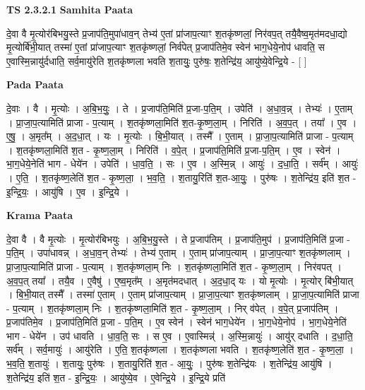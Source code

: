 \documentclass[17pt]{extarticle}
\begin{document}
\textbf{TS 2.3.2.1 } \newline
\textbf{Samhita Paata} \newline

दे॒वा वै मृ॒त्योर॑बिभयु॒स्ते प्र॒जाप॑ति॒मुपा॑धाव॒न् तेभ्य॑ ए॒तां प्रा॑जाप॒त्याꣳ श॒तकृ॑ष्णलां॒ निर॑वप॒त् तयै॒वैष्व॒मृत॑मदधा॒द्यो मृ॒त्योर्बि॑भी॒यात् तस्मा॑ ए॒तां प्रा॑जाप॒त्याꣳ श॒तकृ॑ष्णलां॒ निर्व॑पेत् प्र॒जाप॑तिमे॒व स्वेन॑ भाग॒धेये॒नोप॑ धावति॒ स ए॒वास्मि॒न्नायु॑र्दधाति॒ सर्व॒मायु॑रेति श॒तकृ॑ष्णला भवति श॒तायुः॒ पुरु॑षः॒ श॒तेन्द्रि॑य॒ आयु॑ष्ये॒वेन्द्रि॒ये - [  ] \newline

\textbf{Pada Paata} \newline

दे॒वाः । वै । मृ॒त्योः । अ॒बि॒भ॒युः॒ । ते । प्र॒जाप॑ति॒मिति॑ प्र॒जा-प॒ति॒म् । उपेति॑ । अ॒धा॒व॒न्न् । तेभ्यः॑ । ए॒ताम् । प्रा॒जा॒प॒त्यामिति॑ प्राजा - प॒त्याम् । श॒तकृ॑ष्णला॒मिति॑ श॒त-कृ॒ष्ण॒ला॒म् । निरिति॑ । अ॒व॒प॒त् । तया᳚ । ए॒व । ए॒षु॒ । अ॒मृत᳚म् । अ॒द॒धा॒त् । यः । मृ॒त्योः । बि॒भी॒यात् । तस्मै᳚ । ए॒ताम् । प्रा॒जा॒प॒त्यामिति॑ प्राजा - प॒त्याम् । श॒तकृ॑ष्णला॒मिति॑ श॒त - कृ॒ष्ण॒ला॒म् । निरिति॑ । व॒पे॒त् । प्र॒जाप॑ति॒मिति॑ प्र॒जा-प॒ति॒म् । ए॒व । स्वेन॑ । भा॒ग॒धेये॒नेति॑ भाग - धेये॑न । उपेति॑ । धा॒व॒ति॒ । सः । ए॒व । अ॒स्मि॒न्न् । आयुः॑ । द॒धा॒ति॒ । सर्व᳚म् । आयुः॑ । ए॒ति॒ । श॒तकृ॑ष्ण॒लेति॑ श॒त - कृ॒ष्ण॒ला॒ । भ॒व॒ति॒ । श॒तायु॒रिति॑ श॒त-आ॒युः॒ । पुरु॑षः । श॒तेन्द्रि॑य॒ इति॑ श॒त - इ॒न्द्रि॒यः॒ । आयु॑षि । ए॒व । इ॒न्द्रि॒ये ।  \newline


\textbf{Krama Paata} \newline

दे॒वा वै । वै मृ॒त्योः । मृ॒त्योर॑बिभयुः । अ॒बि॒भ॒यु॒स्ते । ते प्र॒जाप॑तिम् । प्र॒जाप॑ति॒मुप॑ । प्र॒जाप॑ति॒मिति॑ प्र॒जा - प॒ति॒म् । उपा॑धावन्न् । अ॒धा॒व॒न् तेभ्यः॑ । तेभ्य॑ ए॒ताम् । ए॒ताम् प्रा॑जाप॒त्याम् । प्रा॒जा॒प॒त्याꣳ श॒तकृ॑ष्णलाम् । प्रा॒जा॒प॒त्यामिति॑ प्राजा - प॒त्याम् । श॒तकृ॑ष्णला॒म् निः । श॒तकृ॑ष्णला॒मिति॑ श॒त - कृ॒ष्ण॒ला॒म् । निर॑वपत् । अ॒व॒प॒त् तया᳚ । तयै॒व । ए॒वैषु॑ । ए॒ष्व॒मृत᳚म् । अ॒मृत॑मदधात् । अ॒द॒धा॒द् यः । यो मृ॒त्योः । मृ॒त्योर् बि॑भी॒यात् । बि॒भी॒यात् तस्मै᳚ । तस्मा॑ ए॒ताम् । ए॒ताम् प्रा॑जाप॒त्याम् । प्रा॒जा॒प॒त्याꣳ श॒तकृ॑ष्णलाम् । प्रा॒जा॒प॒त्यामिति॑ प्राजा - प॒त्याम् । श॒तकृ॑ष्णला॒म् निः । श॒तकृ॑ष्णला॒मिति॑ श॒त - कृ॒ष्ण॒ला॒म् । निर् व॑पेत् । व॒पे॒त् प्र॒जाप॑तिम् । प्र॒जाप॑तिमे॒व । प्र॒जाप॑ति॒मिति॑ प्र॒जा - प॒ति॒म् । ए॒व स्वेन॑ । स्वेन॑ भाग॒धेये॑न । भा॒ग॒धेये॒नोप॑ । भा॒ग॒धेये॒नेति॑ भाग - धेये॑न । उप॑ धावति । धा॒व॒ति॒ सः । स ए॒व । ए॒वास्मिन्न्॑ । अ॒स्मि॒न्नायुः॑ । आयु॑र् दधाति । द॒धा॒ति॒ सर्व᳚म् । सर्व॒मायुः॑ । आयु॑रेति । ए॒ति॒ श॒तकृ॑ष्णला । श॒तकृ॑ष्णला भवति । श॒तकृ॑ष्ण॒लेति॑ श॒त - कृ॒ष्ण॒ला॒ । भ॒व॒ति॒ श॒तायुः॑ । श॒तायुः॒ पुरु॑षः । श॒तायु॒रिति॑ श॒त - आ॒युः॒ । पुरु॑षः श॒तेन्द्रि॑यः । श॒तेन्द्रि॑य॒ आयु॑षि । श॒तेन्द्रि॑य॒ इति॑ श॒त - इ॒न्द्रि॒यः॒ । आयु॑ष्ये॒व । ए॒वेन्द्रि॒ये । इ॒न्द्रि॒ये प्रति॑ \newline
\end{document}
